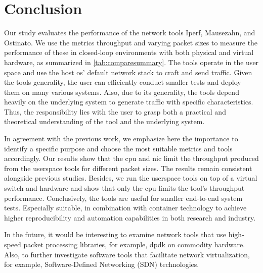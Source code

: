 \chapter{Conclusion}\label{conclusion}

Our study evaluates the performance of the network tools Iperf, Mausezahn, and Ostinato.
We use the metrics throughput and varying packet sizes to measure the performance of these in closed-loop environments with both physical and virtual hardware, as summarized in \cref{tab:comparesummary}.
The tools operate in the user space and use the host \acrshort{os}' default network stack to craft and send traffic.
Given the tools generality, the user can efficiently conduct smaller tests and deploy them on many various systems.
Also, due to its generality, the tools depend heavily on the underlying system to generate traffic with specific characteristics.
Thus, the responsibility lies with the user to grasp both a practical and theoretical understanding of the tool and the underlying system.

\skippara In agreement with the previous work, we emphasize here the importance to identify a specific purpose and choose the most suitable metrics and tools accordingly.
Our results show that the \acrshort{cpu} and \acrshort{nic} limit the throughput produced from the userspace tools for different packet sizes.
The results remain consistent alongside previous studies.
Besides, we run the userspace tools on top of a virtual switch and hardware and show that only the \acrshort{cpu} limits the tool's throughput performance.
Conclusively, the tools are useful for smaller end-to-end system tests.
Especially suitable, in combination with container technology to achieve higher reproducibility and automation capabilities in both research and industry.

\skippara In the future, it would be interesting to examine network tools that use high-speed packet processing libraries, for example, \acrfull{dpdk} on commodity hardware.
Also, to further investigate software tools that facilitate network virtualization, for example, Software-Defined Networking (SDN) technologies.
